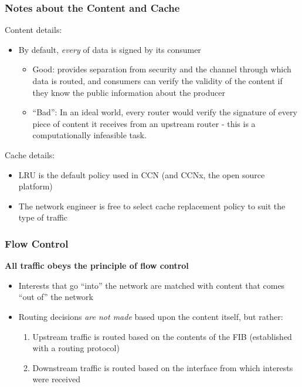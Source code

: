 \documentclass[handout]{beamer}
\begin{document}
\begin{frame}
	\frametitle{Notes about the Content and Cache}
	Content details:
	\begin{itemize}
		\item By default, \emph{every} of data is signed by its consumer
		\begin{itemize}
			\item Good: provides separation from security and the channel through which data is routed, and consumers can verify the validity of the content if they know the public information about the producer
			\item ``Bad'': In an ideal world, every router would verify the signature of every piece of content it receives from an upstream router - this is a computationally infeasible task.
		\end{itemize}
	\end{itemize}
	\medskip

	Cache details:
	\begin{itemize}
		\item LRU is the default policy used in CCN (and CCNx, the open source platform)
		\item The network engineer is free to select cache replacement policy to suit the type of traffic
	\end{itemize}
\end{frame}

\begin{frame}
	\frametitle{Flow Control}
	\begin{center}
		\textbf{All traffic obeys the principle of flow control}
	\end{center}
	\begin{itemize}
		\item Interests that go ``into'' the network are matched with content that comes ``out of'' the network
		\item Routing decisions \emph{are not made} based upon the content itself, but rather:
		\begin{enumerate}
			\item Upstream traffic is routed based on the contents of the FIB (established with a routing protocol)
			\item Downstream traffic is routed based on the interface from which interests were received
		\end{enumerate}
	\end{itemize}
\end{frame}
\end{document}
